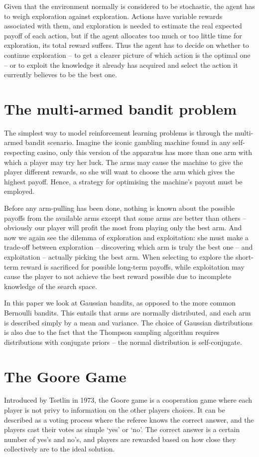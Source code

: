 Given that the environment normally is considered to be stochastic, the agent has to weigh exploration against exploration.
Actions have variable rewards associated with them, and exploration is needed to estimate the real expected payoff of each action, but if the agent allocates too much or too little time for exploration, its total reward suffers.
Thus the agent has to decide on whether to continue exploration -- to get a clearer picture of which action is the optimal one -- or to exploit the knowledge it already has acquired and select the action it currently believes to be the best one.

\section{The multi-armed bandit problem}
The simplest \cite{Kaelbling1996} way to model reinforcement learning problems is through the multi-armed bandit scenario.
Imagine the iconic gambling machine found in any self-respecting casino, only this version of the apparatus has more than one arm with which a player may try her luck.
The arms may cause the machine to give the player different rewards, so she will want to choose the arm which gives the highest payoff.
Hence, a strategy for optimising the machine's payout must be employed.

Before any arm-pulling has been done, nothing is known about the possible payoffs from the available arms except that some arms are better than others -- obviously our player will profit the most from playing only the best arm.
And now we again see the dilemma of exploration and exploitation: she must make a trade-off between exploration 
-- discovering which arm is truly the best one -- and exploitation -- actually picking the best arm.
When selecting to explore the short-term reward is sacrificed for possible long-term payoffs, while exploitation may cause the player to not achieve the best reward possible due to incomplete knowledge of the search space.

In this paper we look at Gaussian bandits, as opposed to the more common Bernoulli bandits.
This entails that arms are normally distributed, and each arm is described simply by a mean and variance.
The choice of Gaussian distributions is also due to the fact that the Thompson sampling algorithm requires distributions with conjugate priors -- the normal distribution is self-conjugate.

\section{The Goore Game}
Introduced by Tsetlin in 1973, the Goore game is a cooperation game where each  
player is not privy to information on the other players choices. It can be 
described as a voting process where the referee knows the correct answer, and 
the players cast their votes as simple ‘yes’ or ‘no’. The correct answer is a 
certain number of yes’s and no’s, and players are rewarded based on how close 
they collectively are to the ideal solution.

